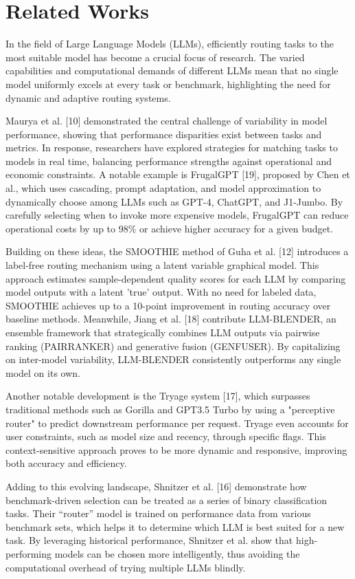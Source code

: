 \section{Related Works}
In the field of Large Language Models (LLMs), efficiently routing tasks to the most suitable model has become a crucial focus of research. The varied capabilities and computational demands of different LLMs mean that no single model uniformly excels at every task or benchmark, highlighting the need for dynamic and adaptive routing systems.

Maurya et al. [10] demonstrated the central challenge of variability in model performance, showing that performance disparities exist between tasks and metrics. In response, researchers have explored strategies for matching tasks to models in real time, balancing performance strengths against operational and economic constraints. A notable example is FrugalGPT [19], proposed by Chen et al., which uses cascading, prompt adaptation, and model approximation to dynamically choose among LLMs such as GPT-4, ChatGPT, and J1-Jumbo. By carefully selecting when to invoke more expensive models, FrugalGPT can reduce operational costs by up to 98\% or achieve higher accuracy for a given budget.

Building on these ideas, the SMOOTHIE method of Guha et al. [12] introduces a label-free routing mechanism using a latent variable graphical model. This approach estimates sample-dependent quality scores for each LLM by comparing model outputs with a latent 'true' output. With no need for labeled data, SMOOTHIE achieves up to a 10-point improvement in routing accuracy over baseline methods. Meanwhile, Jiang et al. [18] contribute LLM-BLENDER, an ensemble framework that strategically combines LLM outputs via pairwise ranking (PAIRRANKER) and generative fusion (GENFUSER). By capitalizing on inter-model variability, LLM-BLENDER consistently outperforms any single model on its own.

Another notable development is the Tryage system [17], which surpasses traditional methods such as Gorilla and GPT3.5 Turbo by using a "perceptive router" to predict downstream performance per request. Tryage even accounts for user constraints, such as model size and recency, through specific flags. This context-sensitive approach proves to be more dynamic and responsive, improving both accuracy and efficiency.

Adding to this evolving landscape, Shnitzer et al. [16] demonstrate how benchmark-driven selection can be treated as a series of binary classification tasks. Their “router” model is trained on performance data from various benchmark sets, which helps it to determine which LLM is best suited for a new task. By leveraging historical performance, Shnitzer et al. show that high-performing models can be chosen more intelligently, thus avoiding the computational overhead of trying multiple LLMs blindly.

